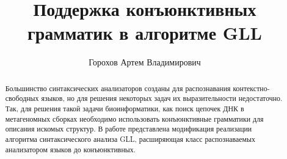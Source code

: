 \title{Поддержка конъюнктивных грамматик в алгоритме GLL}


\author{Горохов Артем Владимирович}



\maketitle             

\begin{abstract}
Большинство синтаксических анализаторов созданы для распознавания контекстно-свободных языков,
но для решения некоторых задач их выразительности недостаточно. 
Так, для решения такой задачи биоинформатики, как поиск цепочек ДНК в метагеномных сборках необходимо 
использовать конъюнктивные грамматики для описания искомых структур. 
В работе представлена модификация реализации алгоритма синтаксического 
анализа GLL, расширяющая класс распознаваемых анализатором языков до конъюнктивных. 
\end{abstract}








